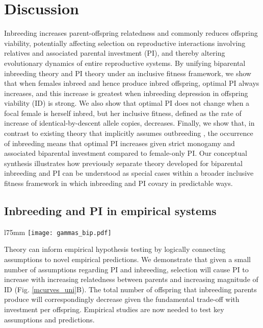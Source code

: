 \documentclass[10pt,letterpaper]{article}
\begin{document}
\section*{Discussion}

Inbreeding increases parent-offspring relatedness and commonly reduces offspring viability, potentially affecting selection on reproductive interactions involving relatives and associated parental investment (PI), and thereby altering evolutionary dynamics of entire reproductive systems. By unifying biparental inbreeding theory and PI theory under an inclusive fitness framework, we show that when females inbreed and hence produce inbred offspring, optimal PI always increases, and this increase is greatest when inbreeding depression in offspring viability (ID) is strong. We also show that optimal PI does not change when a focal female is herself inbred, but her inclusive fitness, defined as the rate of increase of identical-by-descent allele copies, decreases. Finally, we show that, in contrast to existing theory that implicitly assumes outbreeding \cite[][]{Parker1985}, the occurrence of inbreeding means that optimal PI increases given strict monogamy and associated biparental investment compared to female-only PI. Our conceptual synthesis illustrates how previously separate theory developed for biparental inbreeding \cite[][]{Parker1979, Parker2006} and PI \cite[][]{Macnair1978, Parker1978} can be understood as special cases within a broader inclusive fitness framework in which inbreeding and PI covary in predictable ways.

\subsection*{Inbreeding and PI in empirical systems}

\begin{wrapfigure}[23]{l}{75mm}
\texttt{[image: gammas\_bip.pdf]}
\captionsetup{labelformat=empty} 
\caption{} 
\label{gammas_bip} %
\end{wrapfigure} %
Theory can inform empirical hypothesis testing by logically connecting assumptions to novel empirical predictions. We demonstrate that given a small number of assumptions regarding PI and inbreeding, selection will cause PI to increase with increasing relatedness between parents and increasing magnitude of ID (Fig. \ref{mcurves_uni}B). The total number of offspring that inbreeding parents produce will correspondingly decrease given the fundamental trade-off with investment per offspring. Empirical studies are now needed to test key assumptions and predictions.
\end{document}

